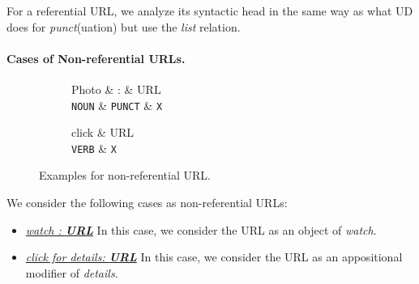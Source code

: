 \documentclass[11pt,a4paper]{article}
\begin{document}
For a referential URL, we analyze its syntactic head in the same way as
what UD does for \textit{punct}(uation) but use the \textit{list}
relation.

\paragraph{Cases of Non-referential URLs.}
\begin{figure}[t]
\centering
\small
\begin{subfigure}[t]{0.45\columnwidth}
	\centering
	\begin{dependency}[edge slant=2, text only label, label style=above]
	\begin{deptext}
		Photo \& : \& URL \\
		\texttt{NOUN} \& \texttt{PUNCT} \& \texttt{X} \\
	\end{deptext}
	\end{dependency}
\end{subfigure}
\begin{subfigure}[t]{0.45\columnwidth}
	\centering
	\begin{dependency}[edge slant=2, text only label, label style=above]
	\begin{deptext}
		click \& URL \\
		\texttt{VERB} \& \texttt{X} \\
	\end{deptext}
\end{dependency}
\end{subfigure}
\caption{Examples for non-referential URL.}\label{fig:non-ref-url}
\end{figure}

We consider the following cases as non-referential URLs:
\begin{itemize}
	\item \underline{\textit{watch : \textbf{URL}}} 
	In this case, we consider the URL as an object of \textit{watch}.
	\item \underline{\textit{click for details: \textbf{URL}}}
	In this case, we consider the URL as an appositional modifier of \textit{details}.
\end{itemize}
\end{document}
